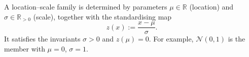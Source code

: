 \begin{definition}
A location--scale family is determined by parameters
$\mu \in \mathbb{R}$ (location) and $\sigma \in \mathbb{R}_{>0}$ (scale),
together with the standardising map
\[
  z(x) := \frac{x - \mu}{\sigma}.
\]
It satisfies the invariants $\sigma > 0$ and $z(\mu) = 0$.
For example, $\mathcal{N}(0, 1)$ is the member with $\mu = 0$, $\sigma = 1$.
\end{definition}
